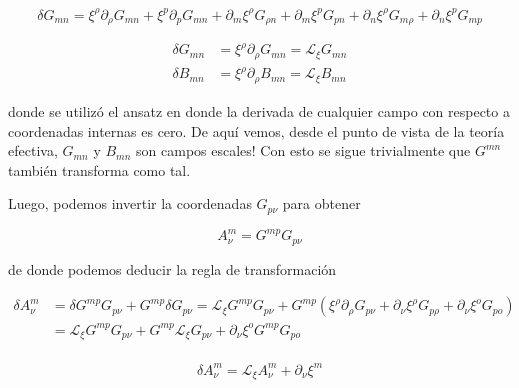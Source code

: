 \documentclass{article}
\numberwithin{equation}{section}
\begin{document}
\begin{equation*}
\delta G_{m n} = \xi^{\rho} \partial_{\rho} G_{m n} + \xi^p \partial_p G_{m n} + \partial_m \xi^{\rho} G_{\rho n} + \partial_m \xi^p G_{p n} + \partial_n \xi^{\rho} G_{m \rho} + \partial_n \xi^p G_{m p}
\end{equation*}
\begin{boxquation}
\begin{equation}\label{GyBscalars}
\begin{aligned}
\delta G_{m n} &= \xi^{\rho} \partial_{\rho} G_{m n} = \mathcal{L}_{\xi} G_{m n}\\
\delta B_{m n} &= \xi^{\rho} \partial_{\rho} B_{m n} = \mathcal{L}_{\xi} B_{m n}
\end{aligned}
\end{equation}
\end{boxquation}

donde se utilizó el ansatz en donde la derivada de cualquier campo con respecto a coordenadas internas es cero. De aquí vemos, desde el punto de vista de la teoría efectiva, $ G_{m n} $ y $ B_{m n} $ son campos escales! Con esto se sigue trivialmente que $ G^{m n} $ también transforma como tal.

Luego, podemos invertir la coordenadas $ G_{p \nu} $ para obtener

\begin{equation}
A^m_{\nu} = G^{m p} G_{p \nu}
\end{equation}

de donde podemos deducir la regla de transformación 

\begin{equation*}
\begin{aligned}
\delta A^m_{\nu} &= \delta G^{m p} G_{p \nu} + G^{m p} \delta G_{p \nu} = \mathcal{L}_{\xi} G^{m p} G_{p \nu} + G^{m p} \left( \xi^{\rho} \partial_{\rho} G_{p \nu} + \partial_{\nu} \xi^{\rho} G_{p \rho} + \partial_{\nu} \xi^{o} G_{p o} \right)\\
&=\mathcal{L}_{\xi} G^{m p} G_{p \nu} + G^{m p} \mathcal{L}_{\xi} G_{p \nu} + \partial_{\nu} \xi^{o} G^{m p} G_{p o}\\
\end{aligned}
\end{equation*}

\begin{boxquation}
	\begin{equation}\label{A}
	\delta A^m_{\nu}= \mathcal{L}_{\xi} A^m_{\nu} + \partial_{\nu} \xi^m
	\end{equation}
\end{boxquation}
\end{document}
